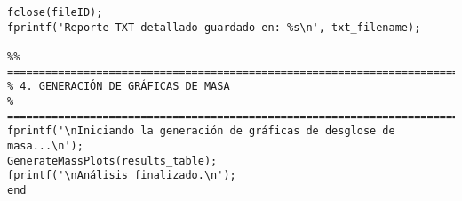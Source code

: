 \begin{verbatim}
fclose(fileID);
fprintf('Reporte TXT detallado guardado en: %s\n', txt_filename);

%% ========================================================================
% 4. GENERACIÓN DE GRÁFICAS DE MASA
% ========================================================================
fprintf('\nIniciando la generación de gráficas de desglose de masa...\n');
GenerateMassPlots(results_table);
fprintf('\nAnálisis finalizado.\n');
end


\end{verbatim}